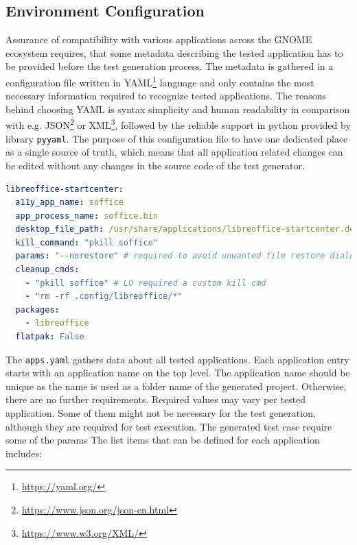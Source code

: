 \subsection{Environment Configuration}\label{env_config}
Assurance of compatibility with various applications across the GNOME ecosystem requires, that some metadata describing the tested application has to be provided before the test generation process. The metadata is gathered in a configuration file written in YAML\footnote{\url{https://yaml.org/}} language and only contains the most necessary information required to recognize tested applications. The reasons behind choosing YAML is syntax simplicity and human readability in comparison with e.g. JSON\footnote{\url{https://www.json.org/json-en.html}} or XML\footnote{\url{https://www.w3.org/XML/}}, followed by the reliable support in python provided by library \texttt{pyyaml}.\cite{yaml} The purpose of this configuration file to have one dedicated place as a single source of truth, which means that all application related changes can be edited without any changes in the source code of the test generator.

\begin{lstlisting}[language=yaml,caption={Example of the apps.yaml entry for LibreOffice Start Center},label={apps.yaml}]
libreoffice-startcenter:
  a11y_app_name: soffice
  app_process_name: soffice.bin
  desktop_file_path: /usr/share/applications/libreoffice-startcenter.desktop
  kill_command: "pkill soffice"
  params: "--norestore" # required to avoid unwanted file restore dialogs
  cleanup_cmds:
    - "pkill soffice" # LO required a custom kill cmd
    - "rm -rf .config/libreoffice/*"
  packages:
    - libreoffice
  flatpak: False
\end{lstlisting}

The \texttt{apps.yaml} gathers data about all tested applications. Each application entry starts with an application name on the top level. The application name should be unique as the name is used as a folder name of the generated project. Otherwise, there are no further requirements. Required values may vary per tested application. Some of them might not be necessary for the test generation, although they are required for test execution.
The generated test case require some of the params 
The list items that can be defined for each application includes:


